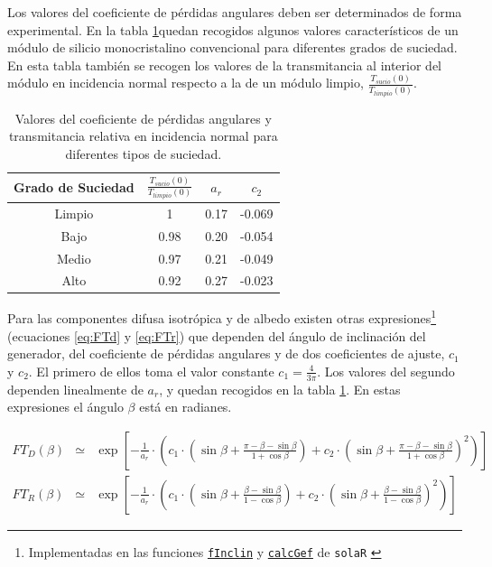 Los valores del coeficiente de pérdidas angulares deben ser determinados
de forma experimental. En la tabla \ref{tab:ar}quedan recogidos algunos
valores característicos de un módulo de silicio monocristalino convencional
para diferentes grados de suciedad. En esta tabla también se recogen
los valores de la transmitancia al interior del módulo en incidencia
normal respecto a la de un módulo limpio, $\frac{T_{sucio}(0)}{T_{limpio}(0)}$.

%
\begin{table}
\caption{Valores del coeficiente de pérdidas angulares y transmitancia relativa
en incidencia normal para diferentes tipos de suciedad.\label{tab:ar}}


\begin{tabular}{cccc}
\toprule 
Grado de Suciedad & $\frac{T_{sucio}(0)}{T_{limpio}(0)}$ & $a_{r}$ & $c_{2}$\tabularnewline
\midrule
\midrule 
Limpio & 1 & 0.17 & -0.069\tabularnewline
\midrule 
Bajo & 0.98 & 0.20 & -0.054\tabularnewline
\midrule 
Medio & 0.97 & 0.21 & -0.049\tabularnewline
\midrule 
Alto & 0.92 & 0.27 & -0.023\tabularnewline
\bottomrule
\end{tabular}
\end{table}


Para las componentes difusa isotrópica y de albedo existen otras
expresiones\footnote{Implementadas en las funciones
  \href{http://search.r-project.org/R/library/solaR/html/fInclin.html}{\texttt{fInclin}}
  y
  \href{http://search.r-project.org/R/library/solaR/html/calcGef.html}{\texttt{calcGef}}
  de \texttt{solaR} \cite{Perpinan2012b}}
(ecuaciones \ref{eq:FTd} y \ref{eq:FTr}) que dependen del ángulo
de inclinación del generador, del coeficiente de pérdidas angulares
y de dos coeficientes de ajuste, $c_{1}$y $c_{2}$. El primero de
ellos toma el valor constante $c_{1}=\frac{4}{3\pi}$. Los valores
del segundo dependen linealmente de $a_{r}$, y quedan recogidos en
la tabla \ref{tab:ar}. En estas expresiones el ángulo $\beta$ está
en radianes.

\begin{eqnarray}
FT_{D}(\beta) & \simeq & \exp[-\frac{1}{a_{r}}\cdot(c_{1}\cdot(\sin\beta+\frac{\pi-\beta-\sin\beta}{1+\cos\beta})+c_{2}\cdot(\sin\beta+\frac{\pi-\beta-\sin\beta}{1+\cos\beta})^{2})]\label{eq:FTd}\\
FT_{R}(\beta) & \simeq & \exp[-\frac{1}{a_{r}}\cdot(c_{1}\cdot(\sin\beta+\frac{\beta-\sin\beta}{1-\cos\beta})+c_{2}\cdot(\sin\beta+\frac{\beta-\sin\beta}{1-\cos\beta})^{2})]\label{eq:FTr}\end{eqnarray}

